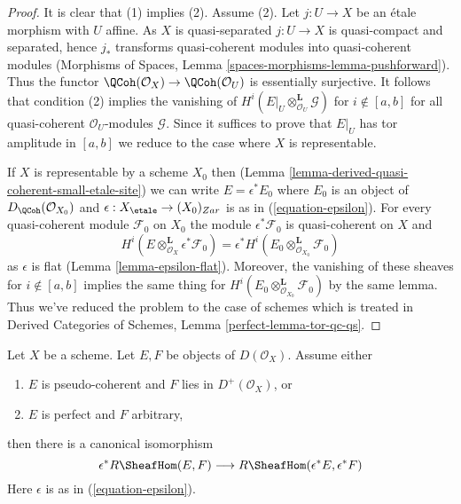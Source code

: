 \begin{proof}
It is clear that (1) implies (2). Assume (2). Let $j : U \to X$ be
an \'etale morphism with $U$ affine. As $X$ is quasi-separated $j : U \to X$
is quasi-compact and separated, hence $j_*$ transforms quasi-coherent
modules into quasi-coherent modules (Morphisms of Spaces, Lemma
\ref{spaces-morphisms-lemma-pushforward}).
Thus the functor
$\QCoh(\mathcal{O}_X) \to \QCoh(\mathcal{O}_U)$
is essentially surjective. It follows that condition (2)
implies the vanishing of
$H^i(E|_U \otimes_{\mathcal{O}_U}^\mathbf{L} \mathcal{G})$
for $i \not \in [a, b]$ for all quasi-coherent $\mathcal{O}_U$-modules
$\mathcal{G}$. Since it suffices to prove that $E|_U$ has tor amplitude
in $[a, b]$ we reduce to the case where $X$ is representable.

\medskip\noindent
If $X$ is representable by a scheme $X_0$ then
(Lemma \ref{lemma-derived-quasi-coherent-small-etale-site})
we can write $E = \epsilon^*E_0$ where $E_0$ is an object of
$D_\QCoh(\mathcal{O}_{X_0})$ and
$\epsilon : X_\etale \to (X_0)_{Zar}$ is as in
(\ref{equation-epsilon}). For every quasi-coherent module
$\mathcal{F}_0$ on $X_0$ the module $\epsilon^*\mathcal{F}_0$
is quasi-coherent on $X$ and
$$
H^i(E \otimes_{\mathcal{O}_X}^\mathbf{L} \epsilon^*\mathcal{F}_0)
=
\epsilon^*H^i(E_0 \otimes_{\mathcal{O}_{X_0}}^\mathbf{L} \mathcal{F}_0)
$$
as $\epsilon$ is flat (Lemma \ref{lemma-epsilon-flat}).
Moreover, the vanishing of these sheaves for $i \not \in [a, b]$
implies the same thing for
$H^i(E_0 \otimes_{\mathcal{O}_{X_0}}^\mathbf{L} \mathcal{F}_0)$
by the same lemma. Thus we've reduced the problem to the case
of schemes which is treated in
Derived Categories of Schemes, Lemma \ref{perfect-lemma-tor-qc-qs}.
\end{proof}

\begin{lemma}
\label{lemma-descend-RHom}
Let $X$ be a scheme. Let $E, F$ be objects of $D(\mathcal{O}_X)$.
Assume either
\begin{enumerate}
\item $E$ is pseudo-coherent and $F$ lies in $D^+(\mathcal{O}_X)$, or
\item $E$ is perfect and $F$ arbitrary,
\end{enumerate}
then there is a canonical isomorphism
$$
\epsilon^*R\SheafHom(E, F) \longrightarrow R\SheafHom(\epsilon^*E, \epsilon^*F)
$$
Here $\epsilon$ is as in (\ref{equation-epsilon}).
\end{lemma}

